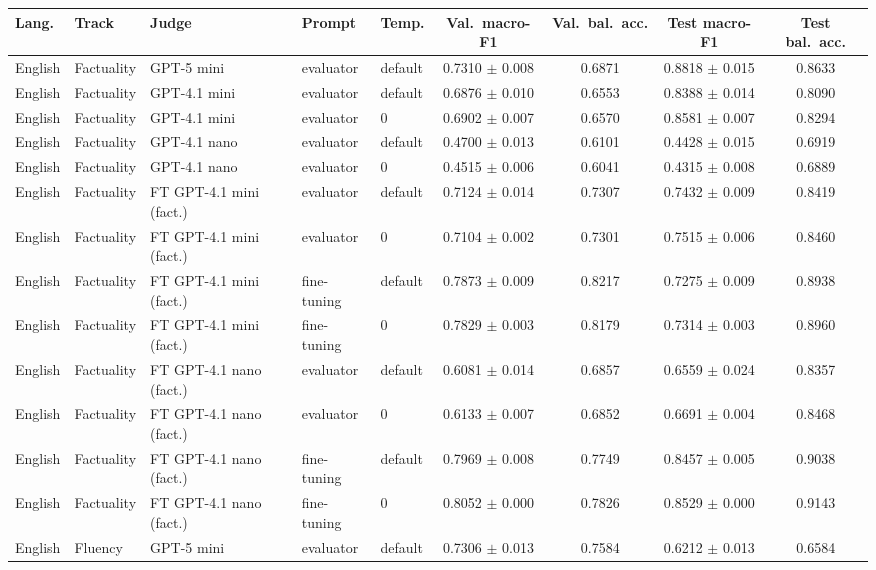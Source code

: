 \begin{tabular}{lllllcccc}
\hline
\textbf{Lang.} & \textbf{Track} & \textbf{Judge} & \textbf{Prompt} & \textbf{Temp.} & \textbf{Val.\ macro-F1} & \textbf{Val.\ bal.\ acc.} & \textbf{Test macro-F1} & \textbf{Test bal.\ acc.} \\
\hline
English & Factuality & GPT-5 mini & evaluator & default & 0.7310 $\pm$ 0.008 & 0.6871 & 0.8818 $\pm$ 0.015 & 0.8633 \\
English & Factuality & GPT-4.1 mini & evaluator & default & 0.6876 $\pm$ 0.010 & 0.6553 & 0.8388 $\pm$ 0.014 & 0.8090 \\
English & Factuality & GPT-4.1 mini & evaluator & 0 & 0.6902 $\pm$ 0.007 & 0.6570 & 0.8581 $\pm$ 0.007 & 0.8294 \\
English & Factuality & GPT-4.1 nano & evaluator & default & 0.4700 $\pm$ 0.013 & 0.6101 & 0.4428 $\pm$ 0.015 & 0.6919 \\
English & Factuality & GPT-4.1 nano & evaluator & 0 & 0.4515 $\pm$ 0.006 & 0.6041 & 0.4315 $\pm$ 0.008 & 0.6889 \\
English & Factuality & FT GPT-4.1 mini (fact.) & evaluator & default & 0.7124 $\pm$ 0.014 & 0.7307 & 0.7432 $\pm$ 0.009 & 0.8419 \\
English & Factuality & FT GPT-4.1 mini (fact.) & evaluator & 0 & 0.7104 $\pm$ 0.002 & 0.7301 & 0.7515 $\pm$ 0.006 & 0.8460 \\
English & Factuality & FT GPT-4.1 mini (fact.) & fine-tuning & default & 0.7873 $\pm$ 0.009 & 0.8217 & 0.7275 $\pm$ 0.009 & 0.8938 \\
English & Factuality & FT GPT-4.1 mini (fact.) & fine-tuning & 0 & 0.7829 $\pm$ 0.003 & 0.8179 & 0.7314 $\pm$ 0.003 & 0.8960 \\
English & Factuality & FT GPT-4.1 nano (fact.) & evaluator & default & 0.6081 $\pm$ 0.014 & 0.6857 & 0.6559 $\pm$ 0.024 & 0.8357 \\
English & Factuality & FT GPT-4.1 nano (fact.) & evaluator & 0 & 0.6133 $\pm$ 0.007 & 0.6852 & 0.6691 $\pm$ 0.004 & 0.8468 \\
English & Factuality & FT GPT-4.1 nano (fact.) & fine-tuning & default & 0.7969 $\pm$ 0.008 & 0.7749 & 0.8457 $\pm$ 0.005 & 0.9038 \\
English & Factuality & FT GPT-4.1 nano (fact.) & fine-tuning & 0 & 0.8052 $\pm$ 0.000 & 0.7826 & 0.8529 $\pm$ 0.000 & 0.9143 \\
\hline
English & Fluency & GPT-5 mini & evaluator & default & 0.7306 $\pm$ 0.013 & 0.7584 & 0.6212 $\pm$ 0.013 & 0.6584 \\

\end{tabular}
